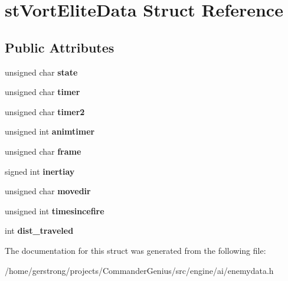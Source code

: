 \hypertarget{structst_vort_elite_data}{
\section{stVortEliteData Struct Reference}
\label{structst_vort_elite_data}
}
\subsection*{Public Attributes}
\begin{DoxyCompactItemize}
\item 
\hypertarget{structst_vort_elite_data_a0ce9ff3f80b8d2afcdcb241384c5082c}{
unsigned char {\bfseries state}}
\label{structst_vort_elite_data_a0ce9ff3f80b8d2afcdcb241384c5082c}

\item 
\hypertarget{structst_vort_elite_data_ae4a88ff9982c18e09a48f5a27074fe37}{
unsigned char {\bfseries timer}}
\label{structst_vort_elite_data_ae4a88ff9982c18e09a48f5a27074fe37}

\item 
\hypertarget{structst_vort_elite_data_a9473f8fa306d29b5667f23f02a9d3ffa}{
unsigned char {\bfseries timer2}}
\label{structst_vort_elite_data_a9473f8fa306d29b5667f23f02a9d3ffa}

\item 
\hypertarget{structst_vort_elite_data_a824a61d7390c3c9dfcf07344cc63ce03}{
unsigned int {\bfseries animtimer}}
\label{structst_vort_elite_data_a824a61d7390c3c9dfcf07344cc63ce03}

\item 
\hypertarget{structst_vort_elite_data_a4def4d5c496e0c0dff6fb1c08c83dd46}{
unsigned char {\bfseries frame}}
\label{structst_vort_elite_data_a4def4d5c496e0c0dff6fb1c08c83dd46}

\item 
\hypertarget{structst_vort_elite_data_ad0b0322946633bfa887a95b78c0a1c98}{
signed int {\bfseries inertiay}}
\label{structst_vort_elite_data_ad0b0322946633bfa887a95b78c0a1c98}

\item 
\hypertarget{structst_vort_elite_data_aa4695be38c73abf8a39bf84b1098994e}{
unsigned char {\bfseries movedir}}
\label{structst_vort_elite_data_aa4695be38c73abf8a39bf84b1098994e}

\item 
\hypertarget{structst_vort_elite_data_a4dce3c99be66247f9a92e88750e521e3}{
unsigned int {\bfseries timesincefire}}
\label{structst_vort_elite_data_a4dce3c99be66247f9a92e88750e521e3}

\item 
\hypertarget{structst_vort_elite_data_ac251483fd38c6df24a0305e0b82521b8}{
int {\bfseries dist\_\-traveled}}
\label{structst_vort_elite_data_ac251483fd38c6df24a0305e0b82521b8}

\end{DoxyCompactItemize}


The documentation for this struct was generated from the following file:\begin{DoxyCompactItemize}
\item 
/home/gerstrong/projects/CommanderGenius/src/engine/ai/enemydata.h\end{DoxyCompactItemize}
